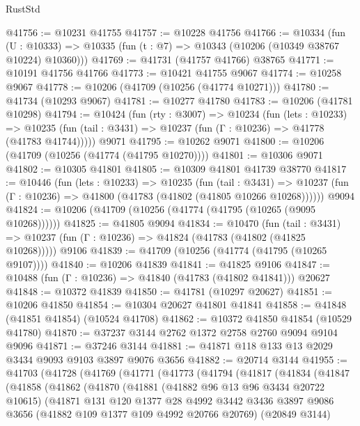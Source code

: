 \begin{lexlean}{RustStd}
\begin{coremodule}
@41756 := @10231 @41755
@41757 := @10228 @41756
@41766 := @10334
    (fun (U : @10333) => @10335 (fun (t : @7) => @10343 (@10206 (@10349 @38767 @10224) @10360)))
@41769 := @41731 (@41757 @41766) @38765
@41771 := @10191 @41756 @41766
@41773 := @10421 @41755 @9067
@41774 := @10258 @9067
@41778 := @10206 (@41709 (@10256 (@41774 @10271)))
@41780 := @41734 (@10293 @9067)
@41781 := @10277 @41780
@41783 := @10206 (@41781 @10298)
@41794 := @10424
    (fun (rty : @3007) =>
    @10234
      (fun (lets : @10233) =>
      @10235 (fun (tail : @3431) => @10237 (fun (Γ : @10236) => @41778 (@41783 @41744)))))
    @9071
@41795 := @10262 @9071
@41800 := @10206 (@41709 (@10256 (@41774 (@41795 @10270))))
@41801 := @10306 @9071
@41802 := @10305 @41801
@41805 := @10309 @41801 @41739 @38770
@41817 := @10446
    (fun (lets : @10233) =>
    @10235
      (fun (tail : @3431) =>
      @10237 (fun (Γ : @10236) => @41800 (@41783 (@41802 (@41805 @10266 @10268))))))
    @9094
@41824 := @10206 (@41709 (@10256 (@41774 (@41795 (@10265 (@9095 @10268))))))
@41825 := @41805 @9094
@41834 := @10470
    (fun (tail : @3431) => @10237 (fun (Γ : @10236) => @41824 (@41783 (@41802 (@41825 @10268)))))
    @9106
@41839 := @41709 (@10256 (@41774 (@41795 (@10265 @9107))))
@41840 := @10206 @41839
@41841 := @41825 @9106
@41847 := @10488 (fun (Γ : @10236) => @41840 (@41783 (@41802 @41841))) @20627
@41848 := @10372 @41839
@41850 := @41781 (@10297 @20627)
@41851 := @10206 @41850
@41854 := @10304 @20627 @41801 @41841
@41858 := @41848 (@41851 @41854) (@10524 @41708)
@41862 := @10372 @41850 @41854 (@10529 @41780)
@41870 := @37237 @3144 @2762 @1372 @2758 @2760 @9094 @9104 @9096
@41871 := @37246 @3144
@41881 := @41871 @118 @133 @13 @2029 @3434 @9093 @9103 @3897 @9076 @3656
@41882 := @20714 @3144
@41955 := @41703
    (@41728
      (@41769
        (@41771
          (@41773
            (@41794
              (@41817
                (@41834
                  (@41847
                    (@41858
                      (@41862
                        (@41870
                          (@41881
                            (@41882 @96 @13 @96 @3434 @20722 @10615)
                            (@41871
                              @131
                              @120
                              @1377
                              @28
                              @4992
                              @3442
                              @3436
                              @3897
                              @9086
                              @3656
                              (@41882 @109 @1377 @109 @4992 @20766 @20769)
                              (@20849 @3144)

\end{coremodule}
\end{lexlean}

